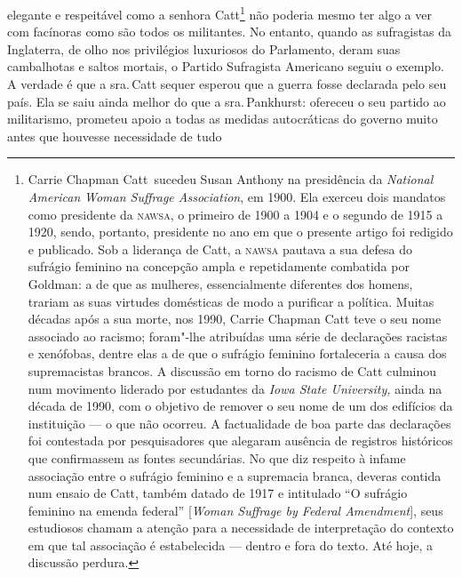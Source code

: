 elegante e respeitável como a senhora Catt\footnote{Carrie Chapman
  Catt~sucedeu Susan Anthony na presidência da \textit{National American}
  \textit{Woman Suffrage Association}, em 1900. Ela exerceu dois mandatos
  como presidente da \textsc{nawsa}, o primeiro de 1900 a 1904 e o segundo de
  1915 a 1920, sendo, portanto, presidente no ano em que o presente
  artigo foi redigido e publicado. Sob a liderança de Catt, a \textsc{nawsa}
  pautava a sua defesa do sufrágio feminino na concepção ampla e
  repetidamente combatida por Goldman: a de que as mulheres,
  essencialmente diferentes dos homens, trariam as suas virtudes
  domésticas de modo a purificar a política. Muitas décadas após a sua
  morte, nos 1990, Carrie Chapman Catt teve o seu nome associado ao
  racismo; foram"-lhe atribuídas uma série de declarações racistas e
  xenófobas, dentre elas a de que o sufrágio feminino fortaleceria a
  causa dos supremacistas brancos. A discussão em torno do racismo de
  Catt culminou num movimento liderado por estudantes da \textit{Iowa
  State University,} ainda na década de 1990, com o objetivo de remover
  o seu nome de um dos edifícios da instituição --- o que não ocorreu. A
  factualidade de boa parte das declarações foi contestada por
  pesquisadores que alegaram ausência de registros históricos que
  confirmassem as fontes secundárias. No que diz respeito à infame
  associação entre o sufrágio feminino e a supremacia branca, deveras
  contida num ensaio de Catt, também datado de 1917 e intitulado ``O
  sufrágio feminino na emenda federal'' {[}\textit{Woman Suffrage by
  Federal Amendment}{]}, seus estudiosos chamam a atenção para a
  necessidade de interpretação do contexto em que tal associação é
  estabelecida --- dentro e fora do texto. Até hoje, a discussão perdura.}
não poderia mesmo ter algo a ver com facínoras como são todos os
militantes. No entanto, quando as sufragistas da Inglaterra, de olho nos
privilégios luxuriosos do Parlamento, deram suas cambalhotas e saltos
mortais, o Partido Sufragista Americano seguiu o exemplo. A verdade é
que a sra.\,Catt sequer esperou que a guerra fosse declarada pelo seu
país. Ela se saiu ainda melhor do que a sra.\,Pankhurst: ofereceu o seu
partido ao militarismo, prometeu apoio a todas as medidas autocráticas
do governo muito antes que houvesse necessidade de tudo
